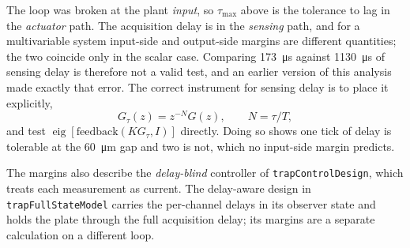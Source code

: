 The loop was broken at the plant \emph{input}, so $\tau_{\max}$ above is the
tolerance to lag in the \emph{actuator} path. The acquisition delay is in the
\emph{sensing} path, and for a multivariable system input-side and output-side
margins are different quantities; the two coincide only in the scalar case.
Comparing \SI{173}{\micro\second} against \SI{1130}{\micro\second} of sensing delay
is therefore not a valid test, and an earlier version of this analysis made exactly
that error. The correct instrument for sensing delay is to place it explicitly,
\begin{equation}
  G_\tau(z)=z^{-N}G(z),\qquad N=\tau/T,
\end{equation}
and test $\operatorname{eig}[\text{feedback}(KG_\tau,I)]$ directly. Doing so shows
one tick of delay is tolerable at the \SI{60}{\micro\metre} gap and two is not,
which no input-side margin predicts.

The margins also describe the \emph{delay-blind} controller of
\texttt{trapControlDesign}, which treats each measurement as current. The
delay-aware design in \texttt{trapFullStateModel} carries the per-channel delays in
its observer state and holds the plate through the full acquisition delay; its
margins are a separate calculation on a different loop.
